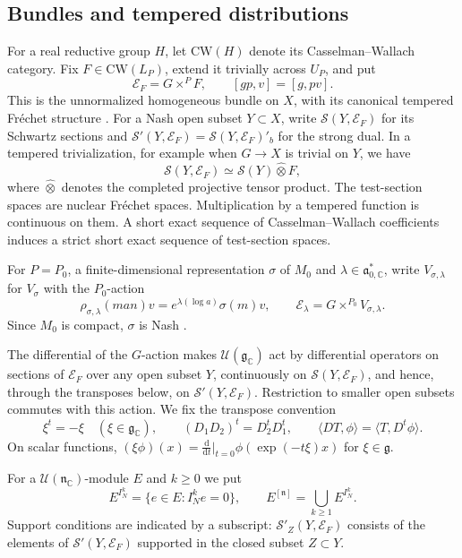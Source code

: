 \documentclass[a4paper,12pt]{amsart}
\numberwithin{equation}{section}
\theoremstyle{definition}
\theoremstyle{remark}
\newcommand{\C}{\mathbb C}
\newcommand{\fg}{\mathfrak g}
\newcommand{\fn}{\mathfrak n}
\newcommand{\fa}{\mathfrak a}
\newcommand{\IN}{I_N}
\newcommand{\mcU}{\mathcal U}
\newcommand{\mcS}{\mathcal S}
\newcommand{\mcE}{\mathcal E}
\newcommand{\dd}{\mathrm d}
\begin{document}
\subsection{Bundles and tempered distributions}\label{ssec:bundles}

For a real reductive group $H$, let $\mathrm{CW}(H)$ denote its Casselman--Wallach category. Fix $F\in\mathrm{CW}(L_P)$, extend it trivially across $U_P$, and put
\[
 \mcE_F=G\times^P F,\qquad [gp,v]=[g,pv].
\]
This is the unnormalized homogeneous bundle on $X$, with its canonical tempered Fr\'echet structure \cite[Section~3.3]{CS21}. For a Nash open subset $Y\subset X$, write $\mcS(Y,\mcE_F)$ for its Schwartz sections and $\mcS'(Y,\mcE_F)=\mcS(Y,\mcE_F)'_b$ for the strong dual. In a tempered trivialization, for example when $G\to X$ is trivial on $Y$, we have
\[
 \mcS(Y,\mcE_F)\simeq\mcS(Y)\widehat\otimes F,
\]
where $\widehat\otimes$ denotes the completed projective tensor product. The test-section spaces are nuclear Fr\'echet spaces. Multiplication by a tempered function is continuous on them. A short exact sequence of Casselman--Wallach coefficients induces a strict short exact sequence of test-section spaces.

For $P=P_0$, a finite-dimensional representation $\sigma$ of $M_0$ and $\lambda\in\fa_{0,\C}^*$, write $V_{\sigma,\lambda}$ for $V_\sigma$ with the $P_0$-action
\[
 \rho_{\sigma,\lambda}(man)v=e^{\lambda(\log a)}\sigma(m)v,
 \qquad \mcE_\lambda=G\times^{P_0}V_{\sigma,\lambda}.
\]
Since $M_0$ is compact, $\sigma$ is Nash \cite[Theorem~1.1(2)]{Sun15}.

The differential of the $G$-action makes $\mcU(\fg_\C)$ act by differential operators on sections of $\mcE_F$ over any open subset $Y$, continuously on $\mcS(Y,\mcE_F)$, and hence, through the transposes below, on $\mcS'(Y,\mcE_F)$. Restriction to smaller open subsets commutes with this action. We fix the transpose convention
\begin{equation}\label{eq:transpose}
 \xi^t=-\xi\quad(\xi\in\fg_\C),\qquad (D_1D_2)^t=D_2^tD_1^t,\qquad \langle DT,\phi\rangle=\langle T,D^t\phi\rangle.
\end{equation}
On scalar functions, $(\xi\phi)(x)=\frac{\dd}{\dd t}\big|_{t=0}\phi(\exp(-t\xi)x)$ for $\xi\in\fg$.

For a $\mcU(\fn_\C)$-module $E$ and $k\ge0$ we put
\[
 E^{\IN^k}=\{e\in E:\IN^ke=0\},\qquad E^{[\fn]}=\bigcup_{k\ge1}E^{\IN^k}.
\]
Support conditions are indicated by a subscript: $\mcS'_Z(Y,\mcE_F)$ consists of the elements of $\mcS'(Y,\mcE_F)$ supported in the closed subset $Z\subset Y$.
\end{document}
